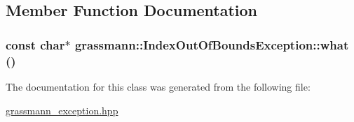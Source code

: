 \subsection{Member Function Documentation}
\hypertarget{classgrassmann_1_1IndexOutOfBoundsException_fbb51d7bba4ec6605cb069f53371f5fe}{
\subsubsection[what]{\setlength{\rightskip}{0pt plus 5cm}const char$\ast$ grassmann::IndexOutOfBoundsException::what ()}}
\label{classgrassmann_1_1IndexOutOfBoundsException_fbb51d7bba4ec6605cb069f53371f5fe}




The documentation for this class was generated from the following file:\begin{CompactItemize}
\item 
\hyperlink{grassmann__exception_8hpp}{grassmann\_\-exception.hpp}\end{CompactItemize}
